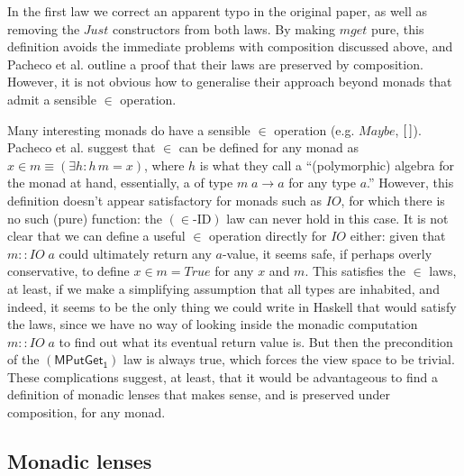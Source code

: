 \documentclass[runningheads]{llncs}
\newcommand{\Conid}[1]{\mathit{#1}}
\newcommand{\Varid}[1]{\mathit{#1}}
\begin{document}
In the first law we correct an apparent typo in the original paper,
as well as removing the \ensuremath{\Conid{Just}} constructors from both laws.  By making \ensuremath{\Varid{mget}}
pure, this definition avoids the immediate problems with composition
discussed above, and Pacheco et al. outline a proof that their laws
are preserved by composition.  However, it is not obvious how to
generalise their approach beyond monads that admit a sensible \ensuremath{\in}
operation.

Many interesting monads do have a sensible \ensuremath{\in} operation
(e.g. \ensuremath{\Conid{Maybe}}, \ensuremath{[\mskip1.5mu \mskip1.5mu]}).  Pacheco et al. suggest that \ensuremath{\in} can be
defined for any monad as $x \in m \equiv (\exists h: h\,m = x)$, where
$h$ is what they call a ``(polymorphic) algebra for the monad at hand,
essentially, a
 of type \ensuremath{\Varid{m}\;\Varid{a}\to \Varid{a}} for any type \ensuremath{\Varid{a}}.''
However, this
definition doesn't appear satisfactory for monads such as \ensuremath{\Conid{IO}}, for
which there is no such (pure) function: the \ensuremath{({\in}\text{-ID})} law can
never hold in this case.  It is not clear that we can define a useful
\ensuremath{\in} operation directly for \ensuremath{\Conid{IO}} either: given that \ensuremath{\Varid{m}\mathbin{::}\Conid{IO}\;\Varid{a}}
could ultimately return any \ensuremath{\Varid{a}}-value, 
it seems safe, if perhaps
overly conservative, to define \ensuremath{\Varid{x}\in\Varid{m}\mathrel{=}\Conid{True}} for any \ensuremath{\Varid{x}} and
\ensuremath{\Varid{m}}. This satisfies the \ensuremath{\in} laws, at least, if we make a
simplifying assumption that all types are inhabited, and indeed, it
seems to be the only thing we could write in Haskell that would
satisfy the laws, since we have no way of looking inside the monadic
computation \ensuremath{\Varid{m}\mathbin{::}\Conid{IO}\;\Varid{a}} to find out what its eventual return value
is. But then the precondition of the \ensuremath{\mathsf{(MPutGet_1)}} law is always true, which
forces the view space to be trivial.  These complications suggest, at
least, that it would be advantageous to find a definition of monadic
lenses that makes sense, and is preserved under composition, for any
monad.




\subsection{Monadic lenses}
\end{document}

